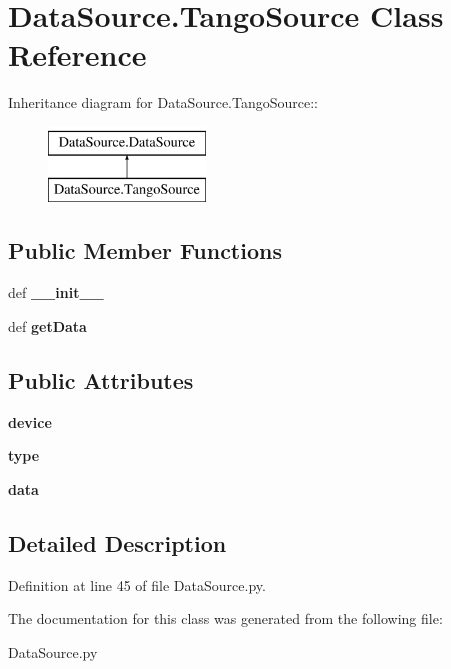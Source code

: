 \hypertarget{classDataSource_1_1TangoSource}{
\section{DataSource.TangoSource Class Reference}
\label{classDataSource_1_1TangoSource}
}
Inheritance diagram for DataSource.TangoSource::\begin{figure}[H]
\begin{center}
\leavevmode
\includegraphics[height=2cm]{classDataSource_1_1TangoSource}
\end{center}
\end{figure}
\subsection*{Public Member Functions}
\begin{DoxyCompactItemize}
\item 
\hypertarget{classDataSource_1_1TangoSource_af09cdec8278319c5720f5eea7cc70072}{
def {\bfseries \_\-\_\-init\_\-\_\-}}
\label{classDataSource_1_1TangoSource_af09cdec8278319c5720f5eea7cc70072}

\item 
\hypertarget{classDataSource_1_1TangoSource_a5fea1cbc0c95ccfa7926aa7add7b6f25}{
def {\bfseries getData}}
\label{classDataSource_1_1TangoSource_a5fea1cbc0c95ccfa7926aa7add7b6f25}

\end{DoxyCompactItemize}
\subsection*{Public Attributes}
\begin{DoxyCompactItemize}
\item 
\hypertarget{classDataSource_1_1TangoSource_a7359a45484dc166e3fee2df2b0325bcc}{
{\bfseries device}}
\label{classDataSource_1_1TangoSource_a7359a45484dc166e3fee2df2b0325bcc}

\item 
\hypertarget{classDataSource_1_1TangoSource_a6f7bc63eea639dd401d42ffcdcab7db7}{
{\bfseries type}}
\label{classDataSource_1_1TangoSource_a6f7bc63eea639dd401d42ffcdcab7db7}

\item 
\hypertarget{classDataSource_1_1TangoSource_ae9655811c99388dbd47c2d9011b824d3}{
{\bfseries data}}
\label{classDataSource_1_1TangoSource_ae9655811c99388dbd47c2d9011b824d3}

\end{DoxyCompactItemize}


\subsection{Detailed Description}


Definition at line 45 of file DataSource.py.

The documentation for this class was generated from the following file:\begin{DoxyCompactItemize}
\item 
DataSource.py\end{DoxyCompactItemize}
